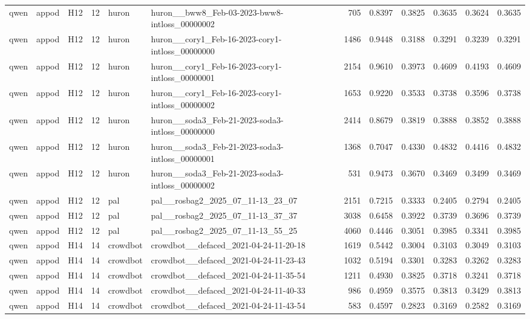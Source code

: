 \begin{table}[tbp]
\begin{tabular}{lllrllrrrrrr}
qwen & appod & H12 & 12 & huron & huron\_\_bww8\_Feb-03-2023-bww8-intloss\_00000002 & 705 & 0.8397 & 0.3825 & 0.3635 & 0.3624 & 0.3635 \\
qwen & appod & H12 & 12 & huron & huron\_\_cory1\_Feb-16-2023-cory1-intloss\_00000000 & 1486 & 0.9448 & 0.3188 & 0.3291 & 0.3239 & 0.3291 \\
qwen & appod & H12 & 12 & huron & huron\_\_cory1\_Feb-16-2023-cory1-intloss\_00000001 & 2154 & 0.9610 & 0.3973 & 0.4609 & 0.4193 & 0.4609 \\
qwen & appod & H12 & 12 & huron & huron\_\_cory1\_Feb-16-2023-cory1-intloss\_00000002 & 1653 & 0.9220 & 0.3533 & 0.3738 & 0.3596 & 0.3738 \\
qwen & appod & H12 & 12 & huron & huron\_\_soda3\_Feb-21-2023-soda3-intloss\_00000000 & 2414 & 0.8679 & 0.3819 & 0.3888 & 0.3852 & 0.3888 \\
qwen & appod & H12 & 12 & huron & huron\_\_soda3\_Feb-21-2023-soda3-intloss\_00000001 & 1368 & 0.7047 & 0.4330 & 0.4832 & 0.4416 & 0.4832 \\
qwen & appod & H12 & 12 & huron & huron\_\_soda3\_Feb-21-2023-soda3-intloss\_00000002 & 531 & 0.9473 & 0.3670 & 0.3469 & 0.3499 & 0.3469 \\
qwen & appod & H12 & 12 & pal & pal\_\_rosbag2\_2025\_07\_11-13\_23\_07 & 2151 & 0.7215 & 0.3333 & 0.2405 & 0.2794 & 0.2405 \\
qwen & appod & H12 & 12 & pal & pal\_\_rosbag2\_2025\_07\_11-13\_37\_37 & 3038 & 0.6458 & 0.3922 & 0.3739 & 0.3696 & 0.3739 \\
qwen & appod & H12 & 12 & pal & pal\_\_rosbag2\_2025\_07\_11-13\_55\_25 & 4060 & 0.4446 & 0.3051 & 0.3985 & 0.3341 & 0.3985 \\
qwen & appod & H14 & 14 & crowdbot & crowdbot\_\_defaced\_2021-04-24-11-20-18 & 1619 & 0.5442 & 0.3004 & 0.3103 & 0.3049 & 0.3103 \\
qwen & appod & H14 & 14 & crowdbot & crowdbot\_\_defaced\_2021-04-24-11-23-43 & 1032 & 0.5194 & 0.3301 & 0.3283 & 0.3262 & 0.3283 \\
qwen & appod & H14 & 14 & crowdbot & crowdbot\_\_defaced\_2021-04-24-11-35-54 & 1211 & 0.4930 & 0.3825 & 0.3718 & 0.3241 & 0.3718 \\
qwen & appod & H14 & 14 & crowdbot & crowdbot\_\_defaced\_2021-04-24-11-40-33 & 986 & 0.4959 & 0.3575 & 0.3813 & 0.3429 & 0.3813 \\
qwen & appod & H14 & 14 & crowdbot & crowdbot\_\_defaced\_2021-04-24-11-43-54 & 583 & 0.4597 & 0.2823 & 0.3169 & 0.2582 & 0.3169 \\

\end{tabular}
\end{table}
